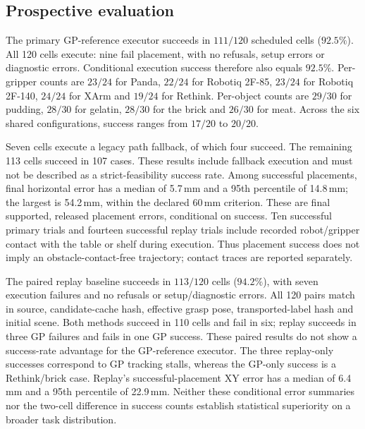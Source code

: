 \subsection{Prospective evaluation}
The primary GP-reference executor succeeds in $111/120$ scheduled cells
($92.5\%$). All 120 cells execute: nine fail placement, with no refusals,
setup errors or diagnostic errors. Conditional execution success therefore
also equals $92.5\%$. Per-gripper counts are $23/24$ for Panda, $22/24$ for
Robotiq 2F-85, $23/24$ for Robotiq 2F-140, $24/24$ for XArm and $19/24$ for
Rethink. Per-object counts are $29/30$ for pudding, $28/30$ for gelatin,
$28/30$ for the brick and $26/30$ for meat. Across the six shared configurations,
success ranges from $17/20$ to $20/20$.

Seven cells execute a legacy path fallback, of which four succeed. The remaining
113 cells succeed in 107 cases. These results include fallback execution and
must not be described as a strict-feasibility success rate. Among successful
placements, final horizontal error has a median of 5.7\,mm and a 95th percentile
of 14.8\,mm; the largest is 54.2\,mm, within the declared 60\,mm criterion.
These are final supported, released placement errors, conditional on success.
Ten successful primary trials and fourteen successful replay trials include
recorded robot/gripper contact with the table or shelf during execution. Thus placement success does not imply an
obstacle-contact-free trajectory; contact traces are reported separately.

The paired replay baseline succeeds in $113/120$ cells ($94.2\%$), with seven
execution failures and no refusals or setup/diagnostic errors. All 120 pairs
match in source, candidate-cache hash, effective grasp pose, transported-label
hash and initial scene. Both methods succeed in 110 cells and fail in six;
replay succeeds in three GP failures and fails in one GP success. These paired
results do not show a success-rate advantage for the GP-reference executor.
The three replay-only successes correspond to GP tracking stalls, whereas the
GP-only success is a Rethink/brick case. Replay's successful-placement XY error
has a median of 6.4\,mm and a 95th percentile of 22.9\,mm. Neither these conditional
error summaries nor the two-cell difference in success counts establish
statistical superiority on a broader task distribution.

